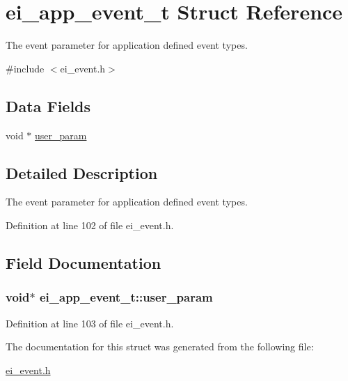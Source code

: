 \hypertarget{structei__app__event__t}{\section{ei\+\_\+app\+\_\+event\+\_\+t Struct Reference}
\label{structei__app__event__t}
}


The event parameter for application defined event types.  




{\ttfamily \#include $<$ei\+\_\+event.\+h$>$}

\subsection*{Data Fields}
\begin{DoxyCompactItemize}
\item 
void $\ast$ \hyperlink{structei__app__event__t_a236a89c3726aa9c770da42ba37ce3d3f}{user\+\_\+param}
\end{DoxyCompactItemize}


\subsection{Detailed Description}
The event parameter for application defined event types. 

Definition at line 102 of file ei\+\_\+event.\+h.



\subsection{Field Documentation}
\hypertarget{structei__app__event__t_a236a89c3726aa9c770da42ba37ce3d3f}{
\subsubsection[{user\+\_\+param}]{\setlength{\rightskip}{0pt plus 5cm}void$\ast$ ei\+\_\+app\+\_\+event\+\_\+t\+::user\+\_\+param}}\label{structei__app__event__t_a236a89c3726aa9c770da42ba37ce3d3f}


Definition at line 103 of file ei\+\_\+event.\+h.



The documentation for this struct was generated from the following file\+:\begin{DoxyCompactItemize}
\item 
\hyperlink{ei__event_8h}{ei\+\_\+event.\+h}\end{DoxyCompactItemize}
